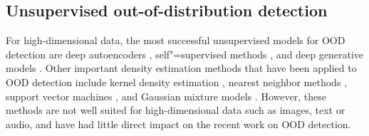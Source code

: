 \subsection{Unsupervised out-of-distribution detection}\label{subsec: unsupervised-out-of-distribution-detection}


For high-dimensional data, the most successful unsupervised models for OOD detection are deep autoencoders \parencite{hinton_reducing_2006}, self"=supervised methods \parencite{mikolov_efficient_2013,devlin_bert_2018,schneider_wav2vec_2019,chen_simple_2020}, and deep generative models \parencite{kingma_autoencoding_2014,rezende_stochastic_2014,dinh_nice_2015,rezende_variational_2015,ho_denoising_2020,hinton_fast_2006,oord_conditional_2016,goodfellow_generative_2014}. 
Other important density estimation methods that have been applied to OOD detection include kernel density estimation \parencite{parzen_estimation_1962}, nearest neighbor methods \parencite{cover_nearest_1967}, support vector machines \parencite{cortes_supportvector_1995,scholkopf_estimating_2001}, and Gaussian mixture models \parencite{dempster_maximum_1977}. 
However, these methods are not well suited for high-dimensional data such as images, text or audio, and have had little direct impact on the recent work on OOD detection. 

